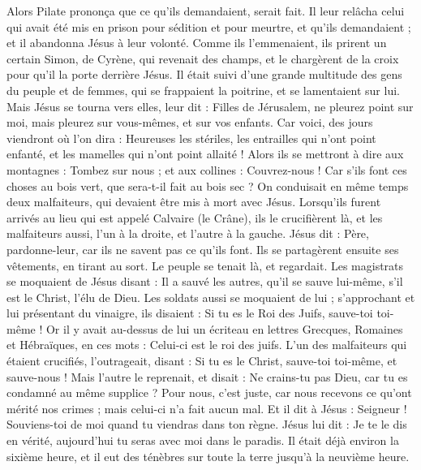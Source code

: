 \begin{multicols}{2}
{Alors Pilate prononça que ce qu'ils demandaient, serait fait.
Il leur relâcha celui qui avait été mis en prison pour sédition et pour meurtre, et qu’ils demandaient ; et il abandonna Jésus à leur volonté.
Comme ils l'emmenaient, ils prirent un certain Simon, de Cyrène, qui revenait des champs, et le chargèrent de la croix pour qu’il la porte derrière Jésus.
Il était suivi d'une grande multitude des gens du peuple et de femmes, qui se frappaient la poitrine, et se lamentaient sur lui.
Mais Jésus se tourna vers elles, leur dit : Filles de Jérusalem, ne pleurez point sur moi, mais pleurez sur vous-mêmes, et sur vos enfants.
Car voici, des jours viendront où l’on dira : Heureuses les stériles, les entrailles qui n’ont point enfanté, et les mamelles qui n'ont point allaité !
Alors ils se mettront à dire aux montagnes : Tombez sur nous ; et aux collines : Couvrez-nous !
Car s'ils font ces choses au bois vert, que sera-t-il fait au bois sec ?
On conduisait en même temps deux malfaiteurs, qui devaient être mis à mort avec Jésus.
Lorsqu’ils furent arrivés au lieu qui est appelé Calvaire (le Crâne), ils le crucifièrent là, et les malfaiteurs aussi, l'un à la droite, et l'autre à la gauche.
Jésus dit : Père, pardonne-leur, car ils ne savent pas ce qu'ils font. Ils se partagèrent ensuite ses vêtements, en tirant au sort.
Le peuple se tenait là, et regardait. Les magistrats se moquaient de Jésus disant : Il a sauvé les autres, qu'il se sauve lui-même, s'il est le Christ, l'élu de Dieu.
Les soldats aussi se moquaient de lui ; s'approchant et lui présentant du vinaigre,
ils disaient : Si tu es le Roi des Juifs, sauve-toi toi-même !
Or il y avait au-dessus de lui un écriteau en lettres Grecques, Romaines et Hébraïques, en ces mots : Celui-ci est le roi des juifs.
L’un des malfaiteurs qui étaient crucifiés, l'outrageait, disant : Si tu es le Christ, sauve-toi toi-même, et sauve-nous !
Mais l'autre le reprenait, et disait : Ne crains-tu pas Dieu, car tu es condamné au même supplice ?
Pour nous, c’est juste, car nous recevons ce qu’ont mérité nos crimes ; mais celui-ci n’a fait aucun mal.
Et il dit à Jésus : Seigneur ! Souviens-toi de moi quand tu viendras dans ton règne.
Jésus lui dit : Je te le dis en vérité, aujourd'hui tu seras avec moi dans le paradis.
Il était déjà environ la sixième heure, et il eut des ténèbres sur toute la terre jusqu'à la neuvième heure.
}
\end{multicols}
